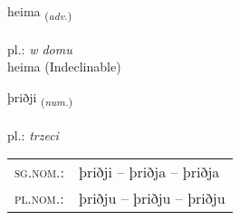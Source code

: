 \documentclass[frontgrid, backgrid]{flacards}\usepackage[]{graphicx}\usepackage[]{xcolor}
\begin{document}

\renewcommand{\flhead}{\vskip5pt \fboxsep=0pt {\small\bfseries\footnotesize Atviksorð | Adverb}}
\renewcommand{\fcfoot}{\vskip5pt \fboxsep=0pt \hspace{2pt}{\small\bfseries\footnotesize 1K}}

\renewcommand{\blhead}{\vskip5pt {\small\bfseries\footnotesize Atviksorð | Adverb }}
\renewcommand{\bcfoot}{\vskip5pt \hspace{2pt}{\small\bfseries\footnotesize 1K}}


{heima \small{\textsubscript{(\textit{adv.})}} \\[1ex]
\textphonetic{[heiːma]} \\
pl.: \emph{w domu} \\  [2ex]
heima (Indeclinable)}

\renewcommand{\flhead}{\vskip5pt \fboxsep=0pt {\small\bfseries\footnotesize Töluorð | Numeral}}
\renewcommand{\fcfoot}{\vskip5pt \fboxsep=0pt \hspace{2pt}{\small\bfseries\footnotesize 1K}}

\renewcommand{\blhead}{\vskip5pt {\small\bfseries\footnotesize Töluorð | Numeral }}
\renewcommand{\bcfoot}{\vskip5pt \hspace{2pt}{\small\bfseries\footnotesize 1K}}


{þriðji \small{\textsubscript{(\textit{num.})}} \\[1ex] %
\textphonetic{[θrɪðjɪ]} \\
pl.: \emph{trzeci} \\  [2ex]
\renewcommand*{\arraystretch}{0.8}
\begin{tabular}{ll}
\textsc{sg.nom.}: & þriðji  --  þriðja -- þriðja \\ 
\textsc{pl.nom.}: & þriðju -- þriðju -- þriðju
\end{tabular}
}

\renewcommand{\flhead}{\vskip5pt \fboxsep=0pt {\small\bfseries\footnotesize Nafnorð | Noun}}
\renewcommand{\fcfoot}{\vskip5pt \fboxsep=0pt \hspace{2pt}{\small\bfseries\footnotesize 1K}}
\end{document}

